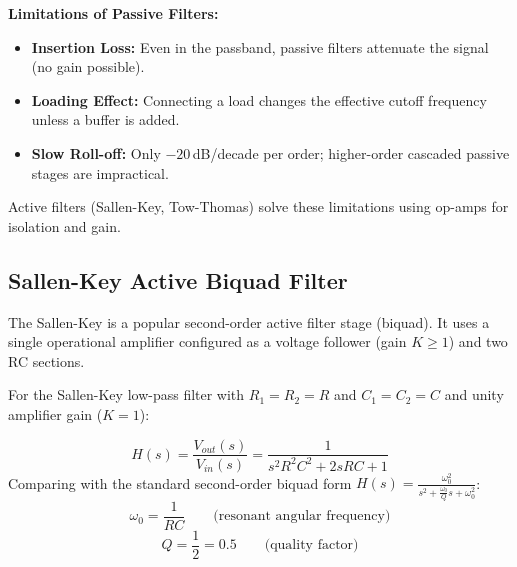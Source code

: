 \documentclass[12pt,a4paper]{article}
\begin{document}
\textbf{Limitations of Passive Filters:}
\begin{itemize}[leftmargin=*, itemsep=2pt]
  \item \textbf{Insertion Loss:} Even in the passband, passive filters attenuate the signal (no gain possible).
  \item \textbf{Loading Effect:} Connecting a load changes the effective cutoff frequency unless a buffer is added.
  \item \textbf{Slow Roll-off:} Only $-20\,$dB/decade per order; higher-order cascaded passive stages are impractical.
\end{itemize}
Active filters (Sallen-Key, Tow-Thomas) solve these limitations using op-amps for isolation and gain.

\subsection{Sallen-Key Active Biquad Filter}
The Sallen-Key is a popular second-order active filter stage (biquad). It uses a single operational amplifier configured as a voltage follower (gain $K \ge 1$) and two RC sections.

\begin{tcolorbox}[tikzbox, title={Second-Order Sallen-Key Low-Pass Active Filter}]
\centering
{}
\end{tcolorbox}

For the Sallen-Key low-pass filter with $R_1 = R_2 = R$ and $C_1 = C_2 = C$ and unity amplifier gain ($K=1$):
\begin{tcolorbox}[formulabox, title={\textbf{Sallen-Key Transfer Function and Parameters}}]
\[
H(s) = \frac{V_{out}(s)}{V_{in}(s)} = \frac{1}{s^2 R^2 C^2 + 2sRC + 1}
\]
Comparing with the standard second-order biquad form $H(s) = \frac{\omega_0^2}{s^2 + \frac{\omega_0}{Q}s + \omega_0^2}$:
\[
\omega_0 = \frac{1}{RC} \qquad \text{(resonant angular frequency)}
\]
\[
Q = \frac{1}{2} = 0.5 \qquad \text{(quality factor)}
\]
\end{tcolorbox}
\end{document}

